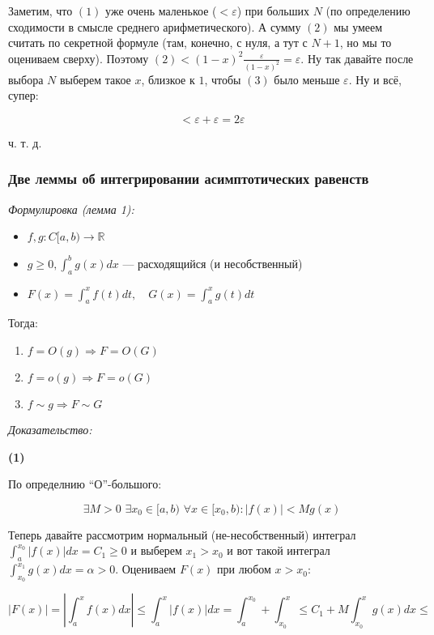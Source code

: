 \documentclass{article}
\def\dbl{\,\,}
\begin{document}
Заметим, что $(1)$ уже очень маленькое ($< \varepsilon$) при больших $N$ (по определению сходимости в смысле среднего арифметического). А сумму $(2)$ мы умеем считать по секретной формуле (там, конечно, с нуля, а тут с $N + 1$, но мы то оцениваем сверху). Поэтому $(2) < (1 - x)^2\frac{\varepsilon}{(1 - x)^2 } = \varepsilon$. Ну так давайте после выбора $N$ выберем такое $x$, близкое к $1$, чтобы $(3)$ было меньше $\varepsilon$. Ну и всё, супер: 

\[< \varepsilon + \varepsilon = 2\varepsilon\]

ч. т. д. 

\subsubsection{Две леммы об интегрировании асимптотических равенств}
\textit{Формулировка (лемма 1):}

\begin{itemize}
    \item $f, g: C[a, b) \rightarrow \mathbb{R}$
    \item $g \ge 0, \int_a^b g(x) dx$ --- расходящийся (и несобственный)
    \item $F(x) = \int_a^x f(t) dt, \quad G(x) = \int_a^x g(t) dt$
\end{itemize}

Тогда:

\begin{enumerate}
    \item $f = O(g) \Rightarrow F = O(G)$
    \item $f = o(g) \Rightarrow F = o(G)$
    \item $f \sim g \Rightarrow F \sim G$
\end{enumerate}

\textit{Доказательство:}

\textbf{(1)}

По определнию ``О''-большого: 

\[\exists M > 0 \dbl \exists x_0 \in [a, b) \dbl \forall x \in [x_0, b): |f(x)| < Mg(x) \]

Теперь давайте рассмотрим нормальный (не-несобственный) интеграл $\int_a^{x_0} |f(x)| dx = C_1 \ge 0$ и выберем $x_1 > x_0$ и вот такой интеграл $\int_{x_0}^{x_1} g(x) dx = \alpha > 0$. Оцениваем $F(x)$ при любом $x > x_0$:

\[|F(x)| = \left|\int_a^x f(x) dx\right| \le \int_a^x |f(x)| dx = \int_a^{x_0} + \int_{x_0}^{x} \le C_1 + M\int_{x_0}^x g(x) dx \le \]
\end{document}
